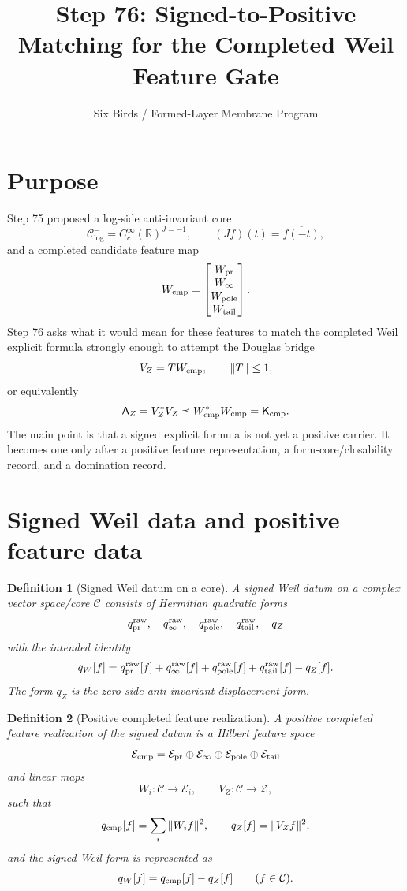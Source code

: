\documentclass[11pt]{article}
\title{Step 76: Signed-to-Positive Matching for the Completed Weil Feature Gate}
\author{Six Birds / Formed-Layer Membrane Program}
\date{}
\newtheorem{definition}{Definition}
\newcommand{\Kcmp}{\mathsf K_{\rm cmp}}
\newcommand{\AZ}{\mathsf A_Z}
\newcommand{\Ccore}{\mathcal C^-_{\log}}
\begin{document}
\maketitle

\section*{Purpose}
Step 75 proposed a log-side anti-invariant core
\[
  \Ccore=C_c^\infty(\mathbb R)^{J=-1},\qquad (Jf)(t)=\overline{f(-t)},
\]
and a completed candidate feature map
\[
  W_{\rm cmp}=\begin{bmatrix}W_{\rm pr}\\ W_\infty\\ W_{\rm pole}\\ W_{\rm tail}\end{bmatrix}.
\]
Step 76 asks what it would mean for these features to match the completed Weil explicit formula strongly enough to attempt the Douglas bridge
\[
  V_Z=T W_{\rm cmp},\qquad \|T\|\le 1,
\]
or equivalently
\[
  \AZ=V_Z^*V_Z\preceq W_{\rm cmp}^*W_{\rm cmp}=\Kcmp.
\]
The main point is that a signed explicit formula is not yet a positive carrier.  It becomes one only after a positive feature representation, a form-core/closability record, and a domination record.

\section{Signed Weil data and positive feature data}

\begin{definition}[Signed Weil datum on a core]
A signed Weil datum on a complex vector space/core \(\mathcal C\) consists of Hermitian quadratic forms
\[
 q_{\rm pr}^{\rm raw},\quad q_\infty^{\rm raw},\quad q_{\rm pole}^{\rm raw},\quad q_{\rm tail}^{\rm raw},\quad q_Z
\]
with the intended identity
\[
 q_W[f]=q_{\rm pr}^{\rm raw}[f]+q_\infty^{\rm raw}[f]+q_{\rm pole}^{\rm raw}[f]+q_{\rm tail}^{\rm raw}[f]-q_Z[f].
\]
The form \(q_Z\) is the zero-side anti-invariant displacement form.
\end{definition}

\begin{definition}[Positive completed feature realization]
A positive completed feature realization of the signed datum is a Hilbert feature space
\[
 \mathcal E_{\rm cmp}=\mathcal E_{\rm pr}\oplus\mathcal E_\infty\oplus\mathcal E_{\rm pole}\oplus\mathcal E_{\rm tail}
\]
and linear maps
\[
 W_i:\mathcal C\to \mathcal E_i,
 \qquad V_Z:\mathcal C\to\mathcal Z,
\]
such that
\[
 q_{\rm cmp}[f]=\sum_i\|W_i f\|^2,
 \qquad q_Z[f]=\|V_Zf\|^2,
\]
and the signed Weil form is represented as
\[
 q_W[f]=q_{\rm cmp}[f]-q_Z[f]
 \qquad (f\in\mathcal C).
\]
\end{definition}
\end{document}
